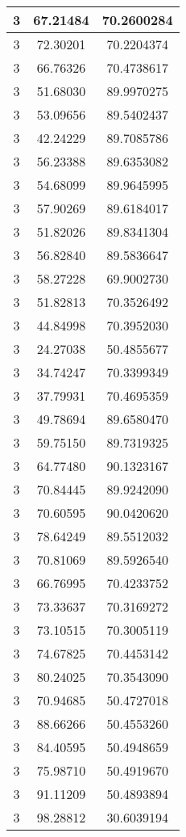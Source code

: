 \documentclass[
]{book}
\begin{document}
\begin{tabular}{c|c|c}
\hline
3 & 67.21484 & 70.2600284\\
\hline
3 & 72.30201 & 70.2204374\\
\hline
3 & 66.76326 & 70.4738617\\
\hline
3 & 51.68030 & 89.9970275\\
\hline
3 & 53.09656 & 89.5402437\\
\hline
3 & 42.24229 & 89.7085786\\
\hline
3 & 56.23388 & 89.6353082\\
\hline
3 & 54.68099 & 89.9645995\\
\hline
3 & 57.90269 & 89.6184017\\
\hline
3 & 51.82026 & 89.8341304\\
\hline
3 & 56.82840 & 89.5836647\\
\hline
3 & 58.27228 & 69.9002730\\
\hline
3 & 51.82813 & 70.3526492\\
\hline
3 & 44.84998 & 70.3952030\\
\hline
3 & 24.27038 & 50.4855677\\
\hline
3 & 34.74247 & 70.3399349\\
\hline
3 & 37.79931 & 70.4695359\\
\hline
3 & 49.78694 & 89.6580470\\
\hline
3 & 59.75150 & 89.7319325\\
\hline
3 & 64.77480 & 90.1323167\\
\hline
3 & 70.84445 & 89.9242090\\
\hline
3 & 70.60595 & 90.0420620\\
\hline
3 & 78.64249 & 89.5512032\\
\hline
3 & 70.81069 & 89.5926540\\
\hline
3 & 66.76995 & 70.4233752\\
\hline
3 & 73.33637 & 70.3169272\\
\hline
3 & 73.10515 & 70.3005119\\
\hline
3 & 74.67825 & 70.4453142\\
\hline
3 & 80.24025 & 70.3543090\\
\hline
3 & 70.94685 & 50.4727018\\
\hline
3 & 88.66266 & 50.4553260\\
\hline
3 & 84.40595 & 50.4948659\\
\hline
3 & 75.98710 & 50.4919670\\
\hline
3 & 91.11209 & 50.4893894\\
\hline
3 & 98.28812 & 30.6039194\\

\end{tabular}
\end{document}
